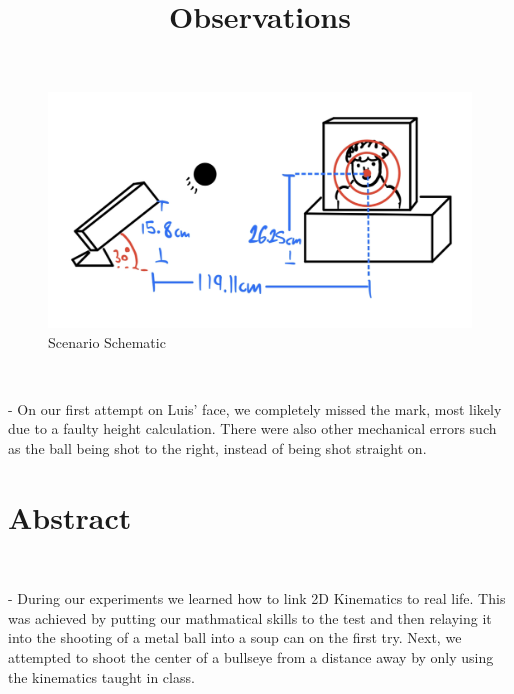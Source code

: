 \documentclass[letter paper, title page]{article}
\begin{document}
\begin{figure}[H]
    \centering
    \includegraphics[scale=0.2]{images/ggluis.jpg}
    \caption{Scenario Schematic}
    \label{fig:my_label}
    
\end{figure}



\noindent
\title{\textbf{Observations}}
\begin{list}
    \\ \item - On our first attempt on Luis' face, we completely missed the mark, most likely due to a faulty height calculation. There were also other mechanical errors such as the ball being shot to the right, instead of being shot straight on. 
\end{list}

\section*{Abstract}
\begin{list}
    \\ \item - During our experiments we learned how to link 2D Kinematics to real life. This was achieved by putting our mathmatical skills to the test and then relaying it into the shooting of a metal ball into a soup can on the first try. Next, we attempted to shoot the center of a bullseye from a distance away by only using the kinematics taught in class. 
\end{list}
\end{document}
